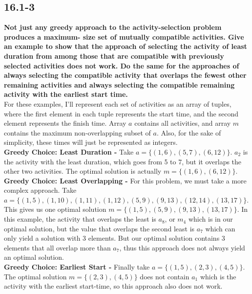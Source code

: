 \documentclass[11pt]{article}
\begin{document}
 \newpage

 \subsection*{16.1-3}
 \textbf{Not just any greedy approach to the activity-selection problem produces a maximum-
 size set of mutually compatible activities. Give an example to show that the approach of 
 selecting the activity of least duration from among those that are compatible with previously 
 selected activities does not work. Do the same for the approaches of always selecting the 
 compatible activity that overlaps the fewest other remaining activities and always selecting 
 the compatible remaining activity with the earliest start time.} \\

 For these examples, I'll represent each set of activities as an array of tuples, where the 
 first element in each tuple represents the start time, and the second element represents the 
 finish time. Array $a$ contains all activities, and array $m$ contains the maximum 
 non-overlapping subset of $a$. Also, for the sake of simplicity, these times will just be 
 represented as integers. \\

 \textbf{Greedy Choice: Least Duration - } Take $a = \{(1,6),(5,7),(6,12)\}$.
 $a_2$ is the activity with the least duration, which goes from 5 to 7, but it overlaps the 
 other two activities. The optimal solution is actually $m = \{(1,6),(6,12)\}$. \\

 \textbf{Greedy Choice: Least Overlapping - } For this problem, we must take a more complex 
 approach. Take $a = \{(1,5),(1,10),(1,11),(1,12),(5,9),(9,13),(12,14),(13,17)\}$. This 
 gives us one optimal solution $m = \{(1,5),(5,9),(9,13),(13,17)\}$.  In this example, the 
 activity that overlaps the least is $a_8$, or $m_4$ which is in our optimal solution, but 
 the value that overlaps the second least is $a_7$ which can only yield a solution with 3 
 elements.  But our optimal solution contains 3 elements that all overlap more than $a_7$, 
 thus this approach does not always yield an optimal solution. \\
 
 \textbf{Greedy Choice: Earliest Start - } Finally take $a = \{(1,5),(2,3),(4,5)\}$.  The 
 optimal solution $m = \{(2,3),(4,5)\}$ does not contain $a_1$ which is the activity with the 
 earliest start-time, so this approach also does not work.
 \newpage
\end{document}
